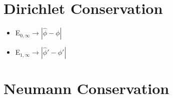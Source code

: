 \documentclass[12pt,a4paper]{article}
\begin{document}
\section{Dirichlet Conservation}
\begin{itemize}
\item E$_{0,\infty}\rightarrow |\widehat \phi-\phi|$ 
\item E$_{1,\infty}\rightarrow |\widehat \phi'-\phi'|$
\end{itemize}

































\section{Neumann Conservation}



















\end{document}

